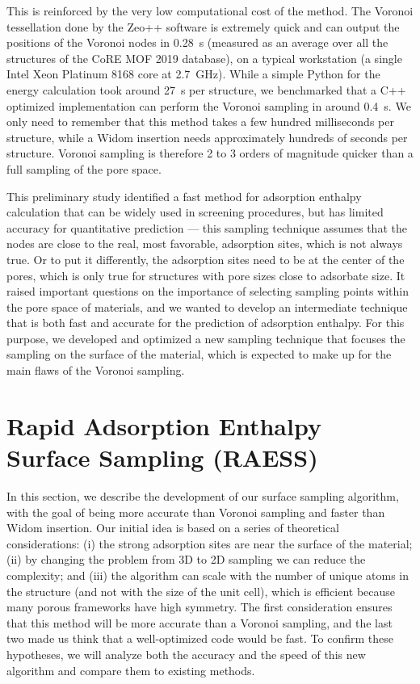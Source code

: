 \documentclass[main]{subfiles}
\begin{document}
This is reinforced by the very low computational cost of the method. The Voronoi tessellation done by the Zeo++ software is extremely quick and can output the positions of the Voronoi nodes in \SI{0.28}{\second} (measured as an average over all the structures of the CoRE MOF 2019 database), on a typical workstation (a single Intel Xeon Platinum 8168 core at 2.7~\si{\giga\hertz}). While a simple Python for the energy calculation took around \SI{27}{\second} per structure, we benchmarked that a C++ optimized implementation can perform the Voronoi sampling in around \SI{0.4}{\second}. We only need to remember that this method takes a few hundred milliseconds per structure, while a Widom insertion needs approximately hundreds of seconds per structure. Voronoi sampling is therefore 2 to 3 orders of magnitude quicker than a full sampling of the pore space.

This preliminary study identified a fast method for adsorption enthalpy calculation that can be widely used in screening procedures, but has limited accuracy for quantitative prediction --- this sampling technique assumes that the nodes are close to the real, most favorable, adsorption sites, which is not always true. Or to put it differently, the adsorption sites need to be at the center of the pores, which is only true for structures with pore sizes close to adsorbate size. It raised important questions on the importance of selecting sampling points within the pore space of materials, and we wanted to develop an intermediate technique that is both fast and accurate for the prediction of adsorption enthalpy. For this purpose, we developed and optimized a new sampling technique that focuses the sampling on the surface of the material, which is expected to make up for the main flaws of the Voronoi sampling.

\section{Rapid Adsorption Enthalpy Surface Sampling (RAESS)}\label{sct:RAESS}

In this section, we describe the development of our surface sampling algorithm, with the goal of being more accurate than Voronoi sampling and faster than Widom insertion. Our initial idea is based on a series of theoretical considerations: (i) the strong adsorption sites are near the surface of the material; (ii) by changing the problem from 3D to 2D sampling we can reduce the complexity; and (iii) the algorithm can scale with the number of unique atoms in the structure (and not with the size of the unit cell), which is efficient because many porous frameworks have high symmetry. The first consideration ensures that this method will be more accurate than a Voronoi sampling, and the last two made us think that a well-optimized code would be fast. To confirm these hypotheses, we will analyze both the accuracy and the speed of this new algorithm and compare them to existing methods.
\end{document}

